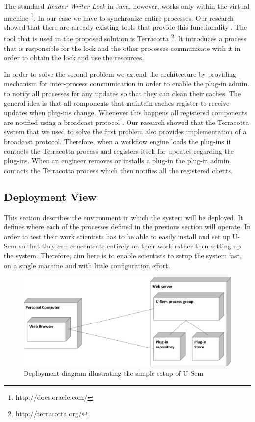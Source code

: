 The standard \textit{Reader-Writer Lock} in Java, however, works only within the virtual machine \footnote{http://docs.oracle.com/}. In our case we have to synchronize entire processes. Our research showed that there are already existing tools that provide this functionality \cite{hernane2012dynamic}. The tool that is used in the proposed solution is Terracotta \footnote{http://terracotta.org/}. It introduces a process that is responsible for the lock and the other processes communicate with it in order to obtain the lock and use the resources.

In order to solve the second problem we extend the architecture by providing mechanism for inter-process communication in order to enable the plug-in admin. to notify all processes for any updates so that they can clean their caches. The general idea is that all components that maintain caches register to receive updates when plug-ins change. Whenever this happens all registered components are notified using a broadcast protocol \cite{joseph1988reliable}. Our research showed that the Terracotta system that we used to solve the first problem also provides implementation of a broadcast protocol. Therefore, when a workflow engine loads the plug-ins it contacts the Terracotta process and registers itself for updates regarding the plug-ins. When an engineer removes or installs a plug-in the plug-in admin. contacts the Terracotta process which then notifies all the registered clients.

\subsection{Deployment View}

This section describes the environment in which the system will be deployed. It defines where each of the processes defined in the previous section will operate. In order to test their work scientists has to be able to easily install and set up U-Sem so that they can concentrate entirely on their work rather then setting up the system. Therefore, aim here is to enable scientists to setup the system fast, on a single machine and with little configuration effort. 

\begin{figure}[h!]
  \centering
  	\includegraphics[scale=0.70]{plug-in/layers/simple_setup.png}
  \caption{Deployment diagram illustrating the simple setup of U-Sem}
  \label{fig:simple_set}
\end{figure}

